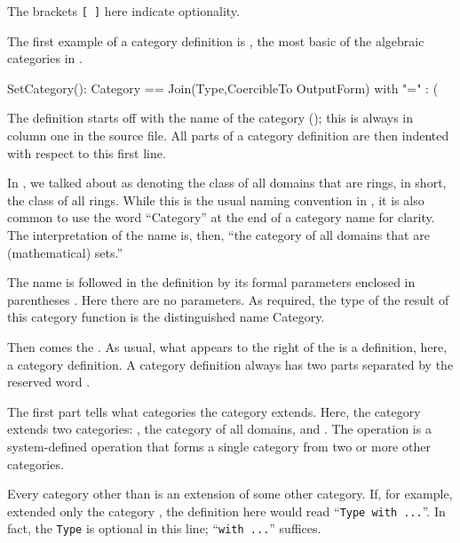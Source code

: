The brackets {\tt [ ]} here indicate optionality.
\endImportant


The first example of a category definition is
,
the most basic of the algebraic categories in \Language{}.

\begin{xmpLines}
SetCategory(): Category ==
   Join(Type,CoercibleTo OutputForm) with
      "=" : (%
\end{xmpLines}

The definition starts off with the name of the
category (); this is
always in column one in the source file.
All parts of a category definition are then indented with respect to this
first line.

In , we talked about  as denoting the
class of all domains that are rings, in short, the class of all
rings.
While this is the usual naming convention in \Language{}, it is also
common to use the word ``Category'' at the end of a category name for clarity.
The interpretation of the name  is, then, ``the
category of all domains that are (mathematical) sets.''

The name  is followed in the definition by its
formal parameters enclosed in parentheses \spadSyntax{()}.
Here there are no parameters.
As required, the type of the result of this category function is the
distinguished name {\sf Category}.

Then comes the \spadSyntax{==}.
As usual, what appears to the right of the \spadSyntax{==} is a
definition, here, a category definition.
A category definition always has two parts separated by the reserved word
.

The first part tells what categories the category extends.
Here, the category extends two categories: , the
category of all domains, and
.
The operation  is a system-defined operation that
forms a single category from two or more other categories.

Every category other than  is an extension of some other
category.
If, for example,  extended only the category
, the definition here would read ``{\tt Type with
...}''.
In fact, the {\tt Type} is optional in this line; ``{\tt with
...}'' suffices.

